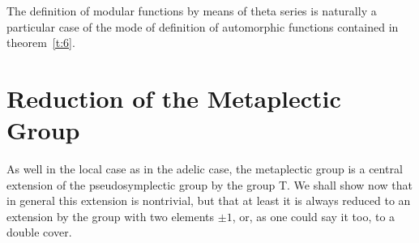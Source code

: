 \documentclass[12pt]{amsart}
\newcounter{ssection}
\renewcommand{\subsection}{
  \addtocounter{ssection}{1}{\bf  \arabic{ssection}.\  }}
\begin{document}
The definition of modular functions by means of theta series 
is naturally a particular case of the 
mode of definition of automorphic functions contained in theorem~\ref{t:6}.


\section{Reduction of the Metaplectic Group}

\subsection{}
As well in the local case as in the adelic case, the metaplectic group
is a central extension of the pseudosymplectic group by the group
T. We shall show now that in general this extension is nontrivial,
but that at least it is always reduced to an extension by the group
with two elements ${\pm1}$, or, as one could say it too, to a double
cover.
\end{document}
